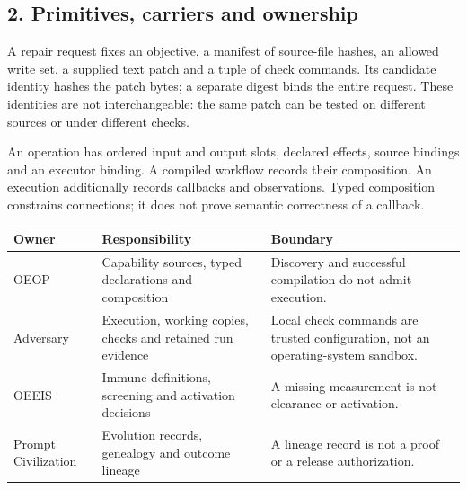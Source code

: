 \documentclass[
  11pt,
]{article}
\begin{document}
\subsection{2. Primitives, carriers and
ownership}\label{primitives-carriers-and-ownership}

A repair request fixes an objective, a manifest of source-file hashes,
an allowed write set, a supplied text patch and a tuple of check
commands. Its candidate identity hashes the patch bytes; a separate
digest binds the entire request. These identities are not
interchangeable: the same patch can be tested on different sources or
under different checks.

An operation has ordered input and output slots, declared effects,
source bindings and an executor binding. A compiled workflow records
their composition. An execution additionally records callbacks and
observations. Typed composition constrains connections; it does not
prove semantic correctness of a callback.

\begin{longtable}[]{@{}
  >{\raggedright\arraybackslash}p{}
  >{\raggedright\arraybackslash}p{}
  >{\raggedright\arraybackslash}p{}@{}}
\toprule\noalign{}
\begin{minipage}[b]{\linewidth}\raggedright
Owner
\end{minipage} & \begin{minipage}[b]{\linewidth}\raggedright
Responsibility
\end{minipage} & \begin{minipage}[b]{\linewidth}\raggedright
Boundary
\end{minipage} \\
\midrule\noalign{}
\endhead
\bottomrule\noalign{}
\endlastfoot
OEOP & Capability sources, typed declarations and composition &
Discovery and successful compilation do not admit execution. \\
Adversary & Execution, working copies, checks and retained run evidence &
Local check commands are trusted configuration, not an operating-system
sandbox. \\
OEEIS & Immune definitions, screening and activation decisions & A
missing measurement is not clearance or activation. \\
Prompt Civilization & Evolution records, genealogy and outcome lineage &
A lineage record is not a proof or a release authorization. \\
\end{longtable}
\end{document}
